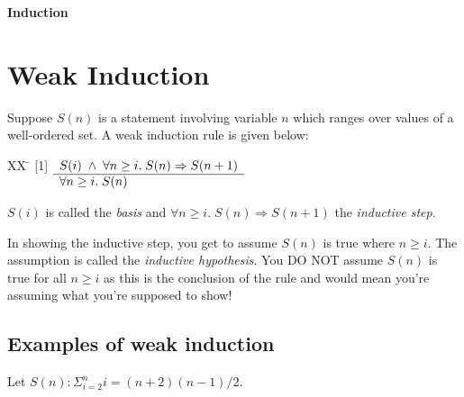 \documentclass[12pt]{article}
\begin{document}
\begin{flushleft}
{\huge {\bf Induction}}
\end{flushleft}

\vspace{7mm}


\thispagestyle{empty}	

\section{Weak Induction}

Suppose $S(n)$ is a statement involving variable $n$ which ranges over
values of a well-ordered set.
A weak induction rule is given below:
\begin{tabbing}
[1]XX \=  \kill
[1] \>
	\(\begin{array}[t]{l}
	S(i) \;\wedge\; \forall n \geq i.\;S(n) \Rightarrow S(n+1) \\
	\hline
	\forall n \geq i. \; S(n)
	\end{array}\) %
\end{tabbing}
$S(i)$ is called the {\em basis\/} and $\forall n \geq i.\;S(n) \Rightarrow S(n+1)$
the {\em inductive step\/}.  %

In showing the inductive step, you get to assume $S(n)$ is true where $n\geq i$.
The assumption is called the {\em inductive hypothesis\/}.
You DO NOT assume $S(n)$ is true for all $n\geq i$ as this is the conclusion of the rule
and would mean you're assuming what you're supposed to show!

\subsection{Examples of weak induction}

Let $S(n): \Sigma_{i=2}^{n}i = (n+2)(n-1)/2$.
\end{document}
